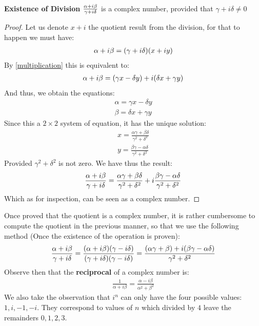 \begin{thm}
	\textbf{Existence of Division} 
	$\frac{ \alpha + i \beta }{ \gamma + i \delta }$ is a complex number, provided that $ \gamma + i \delta \neq 0 $
\end{thm}
\begin{proof}
	Let us denote $ x + i $ the quotient result from the division, for that to happen we must have:
	\begin{align*}
	\alpha + i \beta = (\gamma + i \delta)(x + iy) 
	\end{align*}
	By \eqref{multiplication} this is equivalent to:
	\begin{align*}
	\alpha + i \beta = (\gamma x - \delta y ) + i ( \delta x + \gamma y)
	\end{align*}
	And thus, we obtain the equations:
	\begin{align*}
	\alpha = \gamma x - \delta y \\
	\beta =  \delta x + \gamma y
	\end{align*}
	Since this a $ 2 \times 2$ system of equation, it has the unique solution:
	\begin{align*}
	x = \frac{\alpha \gamma  + \beta \delta}{\gamma^2 + \delta^2} \\
	y = \frac{ \beta \gamma - \alpha \delta}{\gamma^2 + \delta^2}
	\end{align*}
	Provided $ \gamma^2 + \delta^2 $ is not zero.
	We have thus the result:
	\begin{align*}
	\frac{ \alpha + i \beta }{ \gamma + i \delta } =  \frac{\alpha \gamma  + \beta \delta}{\gamma^2 + \delta^2} + i \frac{ \beta \gamma - \alpha \delta}{\gamma^2 + \delta^2} 
	\end{align*}
	Which as for inspection, can be seen as a complex number.
\end{proof}
Once proved that the quotient is a complex number, it is rather cumbersome to compute the quotient in the previous manner, so that we use the following method (Once the existence of the operation is proven):
\begin{align*}
	\frac{\alpha + i \beta }{\gamma + i \delta  } = \frac{(\alpha + i \beta )(\gamma - i \delta )}{(\gamma + i \delta )(\gamma - i \delta )} = \frac{(\alpha \gamma + \beta) + i(\beta \gamma - \alpha \delta)}{\gamma^2 + \delta^2}
\end{align*} 
Observe then that the \textbf{reciprocal} of a complex number is:
\begin{align*}
\frac{1}{ \alpha + i \beta} = \frac{ \alpha - i \beta}{\alpha^2 + \beta^2}
\end{align*}
We also take the observation that $ i^n $ can only have the four possible values: $1, i, -1, -i$. They correspond to values of $n$ which divided by $4$ leave the remainders $ 0,1,2,3 $.

